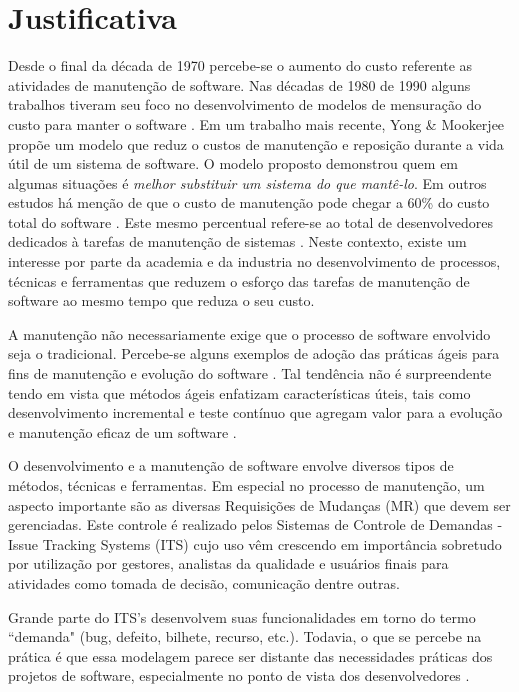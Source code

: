 \documentclass[msc,proposal,hidelot,hideabstract]{ppgccufmg} %
\begin{document}
\chapter{Justificativa}
\label{ch:justificativa}
Desde o final da década de 1970 \cite{Zelkowitz:1979:PSE:578504} percebe-se o aumento do custo referente as
atividades de  manutenção de software. Nas décadas de 1980 de 1990 alguns
trabalhos tiveram seu foco no desenvolvimento de modelos de mensuração do custo
para manter o software \cite{Herrin:1985:SMC:323287.323383,hirota1994approach}.
Em um trabalho mais recente, Yong \& Mookerjee \cite{1423995}  propõe um modelo que reduz o custos de
manutenção e reposição durante a vida útil de um sistema de software. O modelo
proposto demonstrou quem em algumas situações é \textit{melhor substituir um
  sistema do que mantê-lo}. Em outros estudos há menção de que o custo de
manutenção pode chegar a 60\% do custo total do software \cite{kaur2015review}. Este mesmo percentual
refere-se ao total de desenvolvedores dedicados à tarefas de manutenção de
sistemas \cite{Zhang_2003}. Neste contexto, existe um interesse por parte da
academia e da industria no desenvolvimento de processos, técnicas e ferramentas que reduzem o esforço das
tarefas de manutenção de software ao mesmo tempo que reduza o seu custo.

A manutenção não necessariamente exige que o processo de software envolvido
seja o tradicional. Percebe-se alguns exemplos de adoção das práticas ágeis
para fins de manutenção e evolução do software \cite{kajko2009model}. Tal
tendência não é surpreendente tendo em vista que métodos ágeis enfatizam
características úteis, tais como desenvolvimento incremental e teste contínuo
que agregam valor para a evolução e manutenção eficaz de um software
\cite{thomas2006agile}.

O desenvolvimento e a manutenção de software envolve diversos tipos de métodos,
técnicas e ferramentas. Em especial no processo de manutenção, um aspecto
importante são as diversas Requisições de Mudanças (MR) que devem ser
gerenciadas. Este controle é realizado pelos Sistemas de Controle de Demandas -
Issue Tracking Systems (ITS) cujo uso vêm crescendo em importância sobretudo
por utilização por gestores, analistas da qualidade e usuários finais para
atividades como tomada de decisão, comunicação dentre outras.

Grande parte do ITS's desenvolvem suas funcionalidades em torno do termo
``demanda" (bug, defeito, bilhete, recurso, etc.). Todavia, o que se percebe na
prática é que essa modelagem parece ser distante das necessidades práticas dos projetos de software, especialmente
no ponto de vista dos desenvolvedores \cite{Baysal:2013:SAP:2486788.2486957}.
\end{document}
